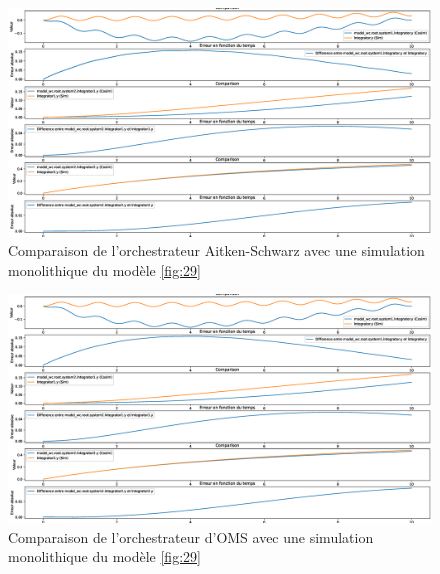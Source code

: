 \begin{figure}[hbt!]
    \centering
    \includegraphics[width =\textwidth]{chainevolOMS.eps}
    \caption{Comparaison de l'orchestrateur Aitken-Schwarz avec une simulation monolithique du modèle \ref{fig:29}}
    \label{fig:27}
\end{figure}

\begin{figure}[hbt!]
    \centering
    \includegraphics[width =\textwidth]{chainevolschwarz.eps}
    \caption{Comparaison de l'orchestrateur d'OMS avec une simulation monolithique du modèle \ref{fig:29}}
    \label{fig:28}
\end{figure}

